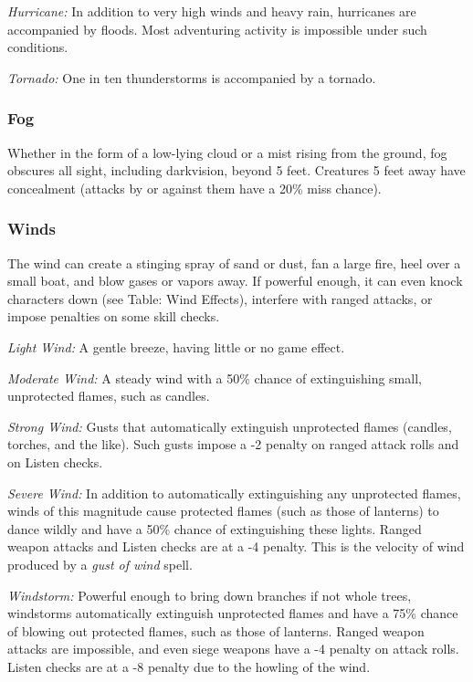 \documentclass{article}
\begin{document}
\textit{Hurricane: }In addition to very high winds and heavy rain, hurricanes are 
accompanied by floods. Most adventuring activity is impossible under such conditions.

\textit{Tornado: }One in ten thunderstorms is accompanied by a tornado.

\subsubsection*{\textbf{Fog}}

Whether in the form of a low-lying cloud or a mist rising from the ground, fog 
obscures all sight, including darkvision, beyond 5 feet. Creatures 5 feet away 
have concealment (attacks by or against them have a 20\% miss chance).

\subsubsection*{\textbf{Winds}}

The wind can create a stinging spray of sand or dust, fan a large fire, heel over 
a small boat, and blow gases or vapors away. If powerful enough, it can even knock 
characters down (see Table: Wind Effects), interfere with ranged attacks, or impose 
penalties on some skill checks.

\textit{Light Wind: }A gentle breeze, having little or no game effect.

\textit{Moderate Wind: }A steady wind with a 50\% chance of extinguishing small, 
unprotected flames, such as candles.

\textit{Strong Wind: }Gusts that automatically extinguish unprotected flames (candles, 
torches, and the like). Such gusts impose a -2 penalty on ranged attack rolls and 
on Listen checks.

\textit{Severe Wind: }In addition to automatically extinguishing any unprotected 
flames, winds of this magnitude cause protected flames (such as those of lanterns) 
to dance wildly and have a 50\% chance of extinguishing these lights. Ranged weapon 
attacks and Listen checks are at a -4 penalty. This is the velocity of wind produced 
by a \textit{gust of wind }spell.

\textit{Windstorm: }Powerful enough to bring down branches if not whole trees, 
windstorms automatically extinguish unprotected flames and have a 75\% chance of 
blowing out protected flames, such as those of lanterns. Ranged weapon attacks 
are impossible, and even siege weapons have a -4 penalty on attack rolls. Listen 
checks are at a -8 penalty due to the howling of the wind. 
\end{document}
